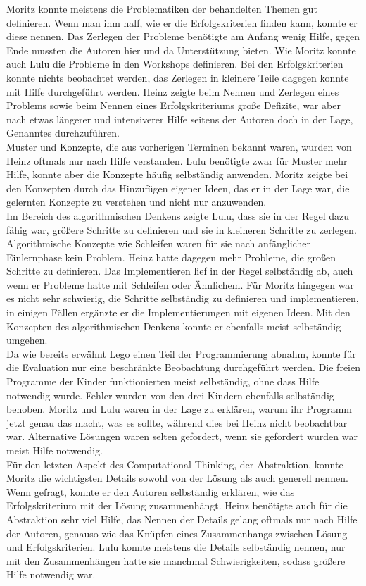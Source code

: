Moritz konnte meistens die Problematiken der behandelten Themen gut definieren. Wenn man ihm half, wie er die Erfolgskriterien finden kann, konnte er diese nennen. Das Zerlegen der Probleme benötigte am Anfang wenig Hilfe, gegen Ende mussten die Autoren hier und da Unterstützung bieten. Wie Moritz konnte auch Lulu die Probleme in den Workshops definieren. Bei den Erfolgskriterien konnte nichts beobachtet werden, das Zerlegen in kleinere Teile dagegen konnte mit Hilfe durchgeführt werden. Heinz zeigte beim Nennen und Zerlegen eines Problems sowie beim Nennen eines Erfolgskriteriums große Defizite, war aber nach etwas längerer und intensiverer Hilfe seitens der Autoren doch in der Lage, Genanntes durchzuführen.\\
Muster und Konzepte, die aus vorherigen Terminen bekannt waren, wurden von Heinz oftmals nur nach Hilfe verstanden. Lulu benötigte zwar für Muster mehr Hilfe, konnte aber die Konzepte häufig selbständig anwenden. Moritz zeigte bei den Konzepten durch das Hinzufügen eigener Ideen, das er in der Lage war, die gelernten Konzepte zu verstehen und nicht nur anzuwenden.\\
Im Bereich des algorithmischen Denkens zeigte Lulu, dass sie in der Regel dazu fähig war, größere Schritte zu definieren und sie in kleineren Schritte zu zerlegen. Algorithmische Konzepte wie Schleifen waren für sie nach anfänglicher Einlernphase kein Problem. Heinz hatte dagegen mehr Probleme, die großen Schritte zu definieren. Das Implementieren lief in der Regel selbständig ab, auch wenn er Probleme hatte mit Schleifen oder Ähnlichem. Für Moritz hingegen war es nicht sehr schwierig, die Schritte selbständig zu definieren und implementieren, in einigen Fällen ergänzte er die Implementierungen mit eigenen Ideen. Mit den Konzepten des algorithmischen Denkens konnte er ebenfalls meist selbständig umgehen.\\
Da wie bereits erwähnt Lego einen Teil der Programmierung abnahm, konnte für die Evaluation nur eine beschränkte Beobachtung durchgeführt werden. Die freien Programme der Kinder funktionierten meist selbständig, ohne dass Hilfe notwendig wurde. Fehler wurden von den drei Kindern ebenfalls selbständig behoben. Moritz und Lulu waren in der Lage zu erklären, warum ihr Programm jetzt genau das macht, was es sollte, während dies bei Heinz nicht beobachtbar war. Alternative Lösungen waren selten gefordert, wenn sie gefordert wurden war meist Hilfe notwendig.\\
Für den letzten Aspekt des Computational Thinking, der Abstraktion, konnte Moritz die wichtigsten Details sowohl von der Lösung als auch generell nennen. Wenn gefragt, konnte er den Autoren selbständig erklären, wie das Erfolgskriterium mit der Lösung zusammenhängt. Heinz benötigte auch für die Abstraktion sehr viel Hilfe, das Nennen der Details gelang oftmals nur nach Hilfe der Autoren, genauso wie das Knüpfen eines Zusammenhangs zwischen Lösung und Erfolgskriterien.  Lulu konnte meistens die Details selbständig nennen, nur mit den Zusammenhängen hatte sie manchmal Schwierigkeiten, sodass größere Hilfe notwendig war.

